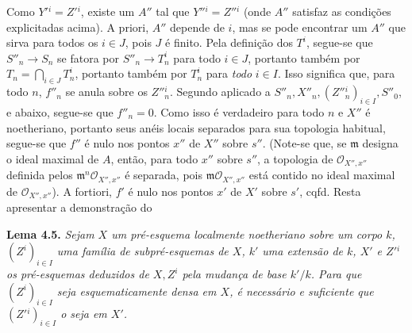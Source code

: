 
Como \(Y'{}^i=Z'{}^i\), existe um \(A''\) tal que
\(Y''{}^i=Z''{}^i\) (onde \(A''\) satisfaz as condições
explicitadas acima). A priori, \(A''\) depende de \(i\), mas se
pode encontrar um \(A''\) que sirva para todos os \(i\in J\),
pois \(J\) é finito. Pela definição dos \(T^i\), segue-se que
\(S''_n\to S_n\) se fatora por \(S''_n\to T_n^i\) para todo
\(i\in J\), portanto também por \(T_n=\bigcap_{i\in J}T_n^i\),
portanto também por \(T_n^i\) para \emph{todo} \(i\in I\).
Isso significa que, para todo \(n\), \(f''_n\) se anula sobre os
\(Z''{}^i_n\). Segundo
 aplicado a
\(S''_n,X''_n,(Z''{}^i_n)_{i\in I},S''_0\), e
 abaixo, segue-se que
\(f''_n=0\). Como isso é verdadeiro para todo \(n\) e \(X''\)
é noetheriano, portanto seus anéis locais separados para sua
topologia habitual, segue-se que \(f''\) é nulo nos pontos \(x''\)
de \(X''\) sobre \(s''\). (Note-se que, se \(\mathfrak m\)
designa o ideal maximal de \(A\), então, para todo \(x''\) sobre
\(s''\), a topologia de \(\mathscr O_{X'',x''}\) definida pelos
\(\mathfrak m^n\mathscr O_{X'',x''}\) é separada, pois
\(\mathfrak m\mathscr O_{X'',x''}\) está contido no ideal maximal
de \(\mathscr O_{X'',x''}\)). A fortiori, \(f'\) é nulo nos
pontos \(x'\) de \(X'\) sobre \(s'\), cqfd. Resta apresentar a
demonstração do

\medskip
\noindent{}\textbf{Lema 4.5.}
\textit{Sejam \(X\) um pré-esquema localmente noetheriano sobre um
corpo \(k\), \((Z^i)_{i\in I}\) uma família de subpré-esquemas de
\(X\), \(k'\) uma extensão de \(k\), \(X'\) e \(Z'{}^i\) os
pré-esquemas deduzidos de \(X,Z^i\) pela mudança de base \(k'/k\).
Para que \((Z^i)_{i\in I}\) seja esquematicamente densa em \(X\),
é necessário e suficiente que \((Z'{}^i)_{i\in I}\) o seja em \(X'\).}

